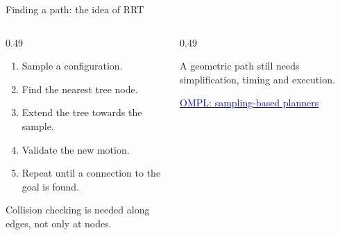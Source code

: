 \documentclass[aspectratio=169]{beamer}
\begin{document}
\begin{frame}[t]{Finding a path: the idea of RRT}
    \small
    \begin{columns}[T,onlytextwidth]
        \begin{column}{0.49\textwidth}
            \begin{enumerate}
                \item Sample a configuration.
                \item Find the nearest tree node.
                \item Extend the tree towards the sample.
                \item Validate the new motion.
                \item Repeat until a connection to the goal is found.
            \end{enumerate}
            Collision checking is needed along edges, not only at nodes.
        \end{column}
        \begin{column}{0.49\textwidth}
            \centering
            \par\raggedright A geometric path still needs simplification, timing and execution.
            \medskip

            \href{https://ompl.kavrakilab.org/planners.html}{\textcolor{blue}{OMPL: sampling-based planners}}
        \end{column}
    \end{columns}
\end{frame}
\end{document}
